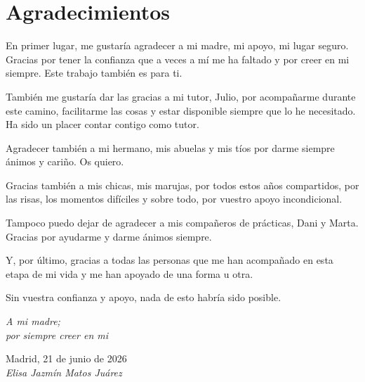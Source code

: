 \cleardoublepage

\chapter*{Agradecimientos}

En primer lugar, me gustaría agradecer a mi madre, mi apoyo, mi lugar seguro. Gracias por tener la confianza que a veces a mí me ha faltado y por creer en mi siempre. Este trabajo también es para ti.

\vspace{0.2cm}

También me gustaría dar las gracias a mi tutor, Julio, por acompañarme durante este camino, facilitarme las cosas y estar disponible siempre que lo he necesitado. Ha sido un placer contar contigo como tutor.

\vspace{0.2cm}

Agradecer también a mi hermano, mis abuelas y mis tíos por darme siempre ánimos y cariño. Os quiero.


\vspace{0.2cm}

Gracias también a mis chicas, mis marujas, por todos estos años compartidos, por las risas, los momentos difíciles y sobre todo, por vuestro apoyo incondicional.

\vspace{0.2cm}

Tampoco puedo dejar de agradecer a mis compañeros de prácticas, Dani y Marta. Gracias por ayudarme y darme ánimos siempre.

\vspace{0.2cm}

Y, por último, gracias a todas las personas que me han acompañado en esta etapa de mi vida y me han apoyado de una forma u otra.


Sin vuestra confianza y apoyo, nada de esto habría sido posible.


\clearpage   %

\thispagestyle{empty}

\begin{flushright}
		\vspace{4.0 cm}
		\emph{A mi madre;\\
      por siempre creer en mi}\\
		\par
		\vspace{1.0 cm}
		Madrid, 21 de junio de 2026\\ %
		\emph{Elisa Jazmín Matos Juárez}
\end{flushright}

\thispagestyle{empty}

